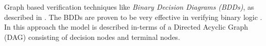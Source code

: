 Graph based verification techniques like \emph{Binary Decision Diagrams (BDDs)}, as described in \cite{Bryant:1986:GAB:6432.6433}. The BDDs are proven to be very effective in verifying binary logic \cite{brace1991efficient}. In this approach the model is described in-terms of a Directed Acyclic Graph (DAG) consisting of decision nodes and terminal nodes. 


\begin{comment}
The terminal nodes can be either 0 or 1 and the decision nodes, with out-degree 2, are nodes combining the terminal 0's or 1's or a combination decision nodes. The left edge going out from the decision node represents case when a variable is 0 and right edge represents the case for 1. 

\autoref{fig:example:bdd} shows a BDD for state machine in \autoref{fig:example:statemachine}, containing decision nodes $X$, $Y$ and $Z$. The terminal nodes containing 0 or 1 based on the evaluation of the formula $(\neg X \vee Z) \wedge (Z \wedge Y)$. The reach-ability analysis on BDD-DAG provides facilities to check if a particular behaviours is possible in the system. For example we can check if $S_3$ is reachable if $Z$ is 0 and it is not possible since all the left edges from Z reach a 0 terminal node. There are various tools like \href{http://fmv.jku.at/abcd/}{ABCD}, \href{http://move.lip6.fr/software/BCC/index.html}{BCC} and \href{http://www.jossowski.de/projects/jinc/jinc.html}{JINC} which can be used to verify programs using BDD.

\begin{figure}[htbp]
   \centering
\begin{tikzpicture}[level/.style={sibling distance=60mm/#1}]
\node (z)[circle,draw] {$X$}
      child {node [circle,draw] (ab) {$Y$}
        child {node [circle,draw] (a) {$Z$}
          child {node [circle,draw] {$0$}}
          child {node [circle,draw] {$0$}}}
        child {node [circle,draw] (b) {$Z$}
          child {node [circle,draw] {$0$}}
          child {node [circle,draw] {$1$}}}}
      child {node [circle,draw] (cd) {$Y$}
        child {node [circle,draw] (c) {$Z$}
          child {node [circle,draw] {$0$}}
          child {node [circle,draw] {$0$}}}
        child {node [circle,draw] (d) {$Z$}
          child {node [circle,draw] {$0$}}
          child {node [circle,draw] {$1$}}}};

   \end{tikzpicture}
   \caption{Binary Decision Diagram (BDD)}
   \label{fig:example:bdd}
\end{figure}

\end{comment}

